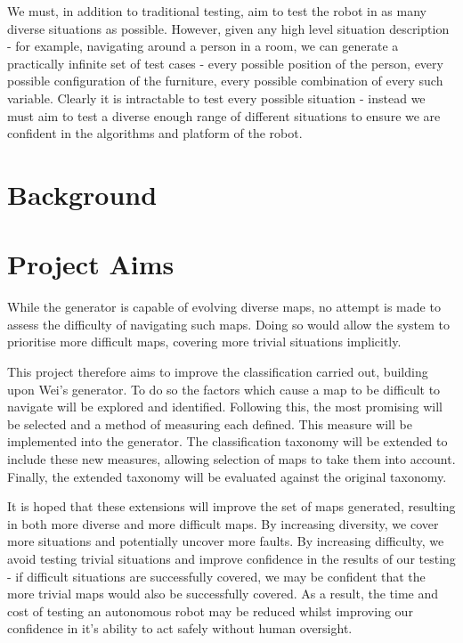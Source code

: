 \documentclass[authoryearcitations]{UoYCSproject}
\begin{document}
We must, in addition to traditional testing, aim to test the robot in as many diverse situations as possible. However, given any high level situation description - for example, navigating around a person in a room, we can generate a practically infinite set of test cases - every possible position of the person, every possible configuration of the furniture, every possible combination of every such variable. Clearly it is intractable to test every possible situation - instead we must aim to test a diverse enough range of different situations to ensure we are confident in the algorithms and platform of the robot. 

\section{Background}
\label{sec:Background}

\section{Project Aims}
\label{sec:ProjectAims}
While the generator is capable of evolving diverse maps, no attempt is made to assess the difficulty of navigating such maps. Doing so would allow the system to prioritise more difficult maps, covering more trivial situations implicitly. 

This project therefore aims to improve the classification carried out, building upon Wei’s generator. To do so the factors which cause a map to be difficult to navigate will be explored and identified. Following this, the most promising will be selected and a method of measuring each defined. This measure will be implemented into the generator. The classification taxonomy will be extended to include these new measures, allowing selection of maps to take them into account. Finally, the extended taxonomy will be evaluated against the original taxonomy.

It is hoped that these extensions will improve the set of maps generated, resulting in both more diverse and more difficult maps. By increasing diversity, we cover more situations and potentially uncover more faults. By increasing difficulty, we avoid testing trivial situations and improve confidence in the results of our testing - if difficult situations are successfully covered, we may be confident that the more trivial maps would also be successfully covered. As a result, the time and cost of testing an autonomous robot may be reduced whilst improving our confidence in it’s ability to act safely without human oversight. 
\end{document}
